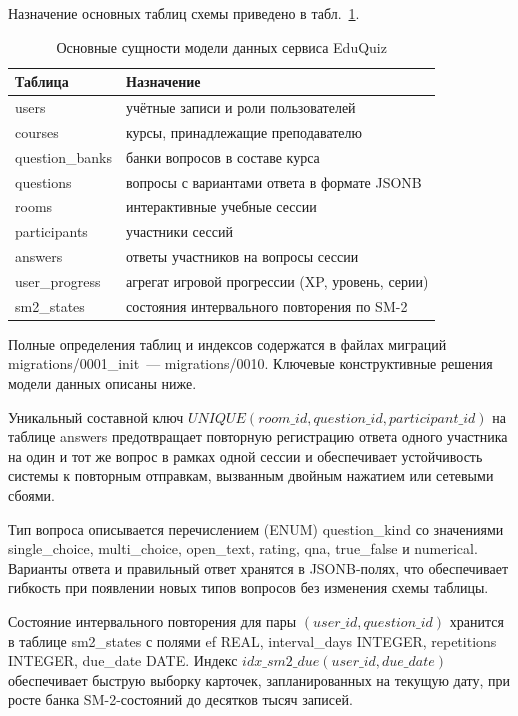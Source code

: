 Назначение основных таблиц схемы приведено
в табл.~\ref{tab:db-entities}.

\begin{table}[!htb]
\fontsize{11pt}{13pt}\selectfont
\centering
\caption{Основные сущности модели данных сервиса EduQuiz}
\label{tab:db-entities}
\smallskip
\begin{tabular}{|l|l|}
    \hline
    \textbf{Таблица} & \textbf{Назначение} \\
    \hline
        users            & учётные записи и роли пользователей \\
    \hline
        courses          & курсы, принадлежащие преподавателю \\
    \hline
        question\_banks  & банки вопросов в составе курса \\
    \hline
        questions        & вопросы с вариантами ответа в формате JSONB \\
    \hline
        rooms            & интерактивные учебные сессии \\
    \hline
        participants     & участники сессий \\
    \hline
        answers          & ответы участников на вопросы сессии \\
    \hline
        user\_progress   & агрегат игровой прогрессии (XP, уровень, серии) \\
    \hline
        sm2\_states      & состояния интервального повторения по SM-2 \\
    \hline
\end{tabular}
\end{table}
\FloatBarrier

Полные определения таблиц и индексов содержатся в файлах миграций
migrations/0001\_init~--- migrations/0010. Ключевые
конструктивные решения модели данных описаны ниже.

Уникальный составной ключ
$UNIQUE (room\_id, question\_id, participant\_id)$
на таблице answers предотвращает повторную регистрацию
ответа одного участника на один и тот же вопрос в рамках одной
сессии и обеспечивает устойчивость системы к повторным отправкам,
вызванным двойным нажатием или сетевыми сбоями.

Тип вопроса описывается перечислением (ENUM) question\_kind
со значениями single\_choice, multi\_choice,
open\_text, rating, qna, true\_false
и numerical. Варианты ответа и правильный ответ хранятся
в JSONB-полях, что обеспечивает гибкость при появлении новых типов
вопросов без изменения схемы таблицы.

Состояние интервального повторения для пары
$(user\_id, question\_id)$ хранится в таблице
sm2\_states с полями ef REAL, interval\_days
INTEGER, repetitions INTEGER, due\_date DATE.
Индекс $idx\_sm2\_due (user\_id, due\_date)$
обеспечивает быструю выборку карточек, запланированных на текущую
дату, при росте банка SM-2-состояний до десятков тысяч записей.

